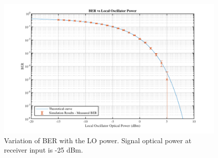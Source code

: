 	\begin{figure}[h]
	\centering
	\includegraphics[width=1\textwidth]
	{sdf/m_qam_system/figures/simulations/04_incLO/berCurveVarLO.pdf}
	\caption{Variation of BER with the LO power. Signal optical power at receiver 
	input is -25 dBm.}\label{fig:sim_incLO_varLO}
\end{figure}

